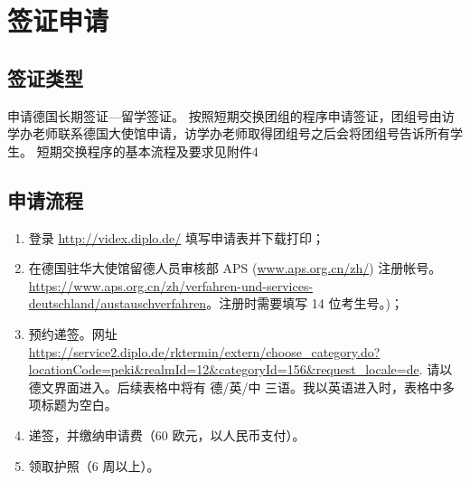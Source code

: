 \documentclass{article}
\begin{document}
\section{签证申请}
\subsection{签证类型}
申请德国长期签证---留学签证。 
按照短期交换团组的程序申请签证，团组号由访学办老师联系德国大使馆申请，访学办老师取得团组号之后会将团组号告诉所有学生。
短期交换程序的基本流程及要求见附件4

\subsection{申请流程}
\begin{enumerate}
\item 登录 \url{http://videx.diplo.de/} 填写申请表并下载打印；
\item \sloppy 在德国驻华大使馆留德人员审核部 APS (\url{www.aps.org.cn/zh/}) 注册帐号。\url{https://www.aps.org.cn/zh/verfahren-und-services-deutschland/austauschverfahren}。注册时需要填写 14 位考生号。)；
\item 预约递签。网址 \url{https://service2.diplo.de/rktermin/extern/choose_category.do?locationCode=peki&realmId=12&categoryId=156&request_locale=de}. 请以德文界面进入。后续表格中将有 德/英/中 三语。我以英语进入时，表格中多项标题为空白。 
\item 递签，并缴纳申请费（60 欧元，以人民币支付）。
\item 领取护照（6 周以上）。
\end{enumerate}
\end{document}
